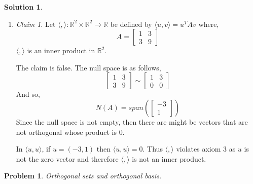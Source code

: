 \documentclass{article}
\newtheorem{problem}{Problem}
\theoremstyle{definition}
\newtheorem*{solution}{Solution}
\theoremstyle{remark}
\newtheorem*{theorem}{Claim}
\begin{document}
\begin{solution}
\begin{enumerate}[\quad(a)]
\begin{proof}
  And thus, $\langle ,\rangle$ satisfies all three axioms and is an inner product.
  \end{proof}
 \item
  \begin{theorem}
  Let $\langle ,\rangle : \mathbb{R}^2 \times \mathbb{R}^2\rightarrow \mathbb{R}$ be defined by $\langle u,v \rangle = u^T Av$ where,
  \[
  A=\begin{bmatrix}
  1 & 3 \\ 3 & 9
  \end{bmatrix}
  \]
  $\langle ,\rangle$ is an inner product in $\mathbb{R}^2$.
  \end{theorem}
  The claim is false.
  The null space is as follows,
  \[
  \begin{bmatrix}
  1 & 3 \\ 3 & 9
  \end{bmatrix}\sim
  \begin{bmatrix}
  1 & 3 \\ 0 & 0
  \end{bmatrix}
  \]
  And so,
  \[
  N(A)=span\left(
  \begin{bmatrix}
  -3 \\ 1
  \end{bmatrix}\right)
  \]
  Since the null space is not empty, then there are might be vectors that are not orthogonal whose product is $0$.
  
  In $\langle u,u \rangle$, if $u=(-3, 1)$ then $\langle u,u \rangle = 0$.
  Thus $\langle ,\rangle$ violates axiom 3 as $u$ is not the zero vector and therefore $\langle ,\rangle$ is not an inner product.
\end{enumerate}

\end{solution}

\begin{problem}

Orthogonal sets and orthogonal basis.

\end{problem}
\end{document}

